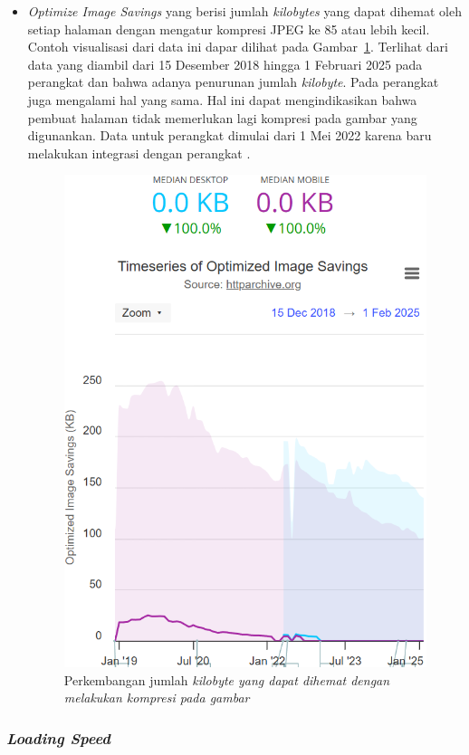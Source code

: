 \begin{itemize}
    \item \textit{Optimize Image Savings} yang berisi jumlah \textit{kilobytes} yang dapat dihemat oleh setiap halaman dengan mengatur kompresi JPEG ke 85 atau lebih kecil. Contoh visualisasi dari data ini dapar dilihat pada Gambar~\ref{fig:optimizesaving}. Terlihat dari data yang diambil dari 15 Desember 2018 hingga 1 Februari 2025 pada perangkat \desktop dan \mobile bahwa adanya penurunan jumlah \textit{kilobyte}. Pada perangkat \desktop juga mengalami hal yang sama. Hal ini dapat mengindikasikan bahwa pembuat halaman \web tidak memerlukan lagi kompresi pada gambar yang digunankan. Data untuk perangkat \desktop dimulai dari 1 Mei 2022 karena \light baru melakukan integrasi dengan perangkat \desktop.
    \begin{figure}[H]
        \centering
        \includegraphics[width=0.4\linewidth]{Gambar/Contoh Optimize Image.png}
        \caption{Perkembangan jumlah \textit{kilobyte yang dapat dihemat dengan melakukan kompresi pada gambar}}
        \label{fig:optimizesaving}
    \end{figure}
\end{itemize}

\subsubsection{\textit{Loading Speed}}
\label{subsub:loading}

